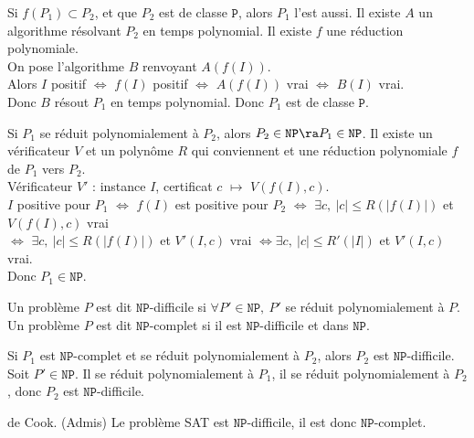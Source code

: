 \documentclass[french, 11pt]{article}
\renewcommand*{\P}{\texttt{P}}
\newcommand*{\NP}{\texttt{NP}}
\begin{document}
\begin{prop}{}{}
    Si $f(P_1) \subset P_2$, et que $P_2$ est de classe $\P$, alors $P_1$ l'est aussi.
    \tcblower
    Il existe $A$ un algorithme résolvant $P_2$ en temps polynomial. Il existe $f$ une réduction polynomiale.\\
    On pose l'algorithme $B$ renvoyant $A(f(I))$.\\
    Alors $I$ positif $\iff$ $f(I)$ positif $\iff$ $A(f(I))$ vrai $\iff$ $B(I)$ vrai.\\
    Donc $B$ résout $P_1$ en temps polynomial. Donc $P_1$ est de classe $\P$.  
\end{prop}

\begin{prop}{}{}
    Si $P_1$ se réduit polynomialement à $P_2$, alors $P_2\in\NP\ra P_1\in\NP$.
    \tcblower
    Il existe un vérificateur $V$ et un polynôme $R$ qui conviennent et une réduction polynomiale $f$ de $P_1$ vers $P_2$.\\
    Vérificateur $V'$ : instance $I$, certificat $c$ $\mapsto$ $V(f(I),c)$.\\
    $I$ positive pour $P_1$ $\iff$ $f(I)$ est positive pour $P_2$ $\iff$ $\exists c, ~ |c|\leq R(|f(I)|)$ et $V(f(I),c)$ vrai\\
    $\iff$ $\exists c, ~ |c|\leq R(|f(I)|)$ et $V'(I,c)$ vrai $\iff \exists c, ~ |c|\leq R'(|I|)$ et $V'(I,c)$ vrai.\\
    Donc $P_1\in\NP$. 
\end{prop}

\begin{defi}{}{}
    Un problème $P$ est dit $\NP$-difficile si $\forall P'\in\NP, ~ P'$ se réduit polynomialement à $P$.\\
    Un problème $P$ est dit $\NP$-complet si il est $\NP$-difficile et dans $\NP$. 
\end{defi}

\vspace*{-0.5cm}

\begin{prop}{}{}
    Si $P_1$ est $\NP$-complet et se réduit polynomialement à $P_2$, alors $P_2$ est $\NP$-difficile.
    \tcblower
    Soit $P'\in\NP$. Il se réduit polynomialement à $P_1$, il se réduit polynomialement à $P_2$, donc $P_2$ est $\NP$-difficile.
\end{prop}

\vspace*{-0.5cm}

\begin{thm}{de Cook. (Admis)}{}
    Le problème SAT est $\NP$-difficile, il est donc $\NP$-complet.
\end{thm}
\end{document}
